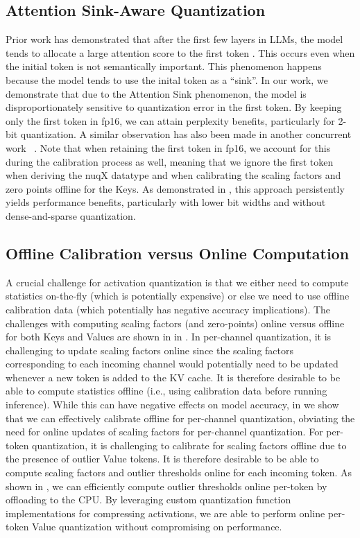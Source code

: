 \subsection{Attention Sink-Aware Quantization}
\label{sec:attn-sink}

Prior work has demonstrated that after the first few layers in LLMs, the model tends to allocate a large attention score to the first token \cite{xiao2023efficient}. This occurs even when the initial token is not semantically important. This phenomenon happens because the model tends to use the inital token as a “sink”. In our work, we demonstrate that due to the Attention Sink phenomenon, the model is disproportionately sensitive to quantization error in the first token. By keeping only the first token in fp16, we can attain perplexity benefits, particularly for 2-bit quantization. A similar observation has also been made in another concurrent work ~\cite{liu2024intactkv}. Note that when retaining the first token in fp16, we account for this during the calibration process as well, meaning that we ignore the first token when deriving the nuqX datatype and when calibrating the scaling factors and zero points offline for the Keys. As demonstrated in , this approach persistently yields performance benefits, particularly with lower bit widths and without dense-and-sparse quantization.

\subsection{Offline Calibration versus Online Computation}
\label{sec:calibration}

A crucial challenge for activation quantization is that we either need to compute statistics on-the-fly (which is potentially expensive) or else we need to use offline calibration data (which potentially has negative accuracy implications). The challenges with computing scaling factors (and zero-points) online versus offline for both Keys and Values are shown in  in .
In per-channel quantization, it is challenging to update scaling factors online since the scaling factors corresponding to each incoming channel would potentially need to be updated whenever a new token is added to the KV cache. It is therefore desirable to be able to compute statistics offline (i.e., using calibration data before running inference). While this can have negative effects on model accuracy, in  we show that we can effectively calibrate offline for per-channel quantization, obviating the need for online updates of scaling factors for per-channel quantization. For per-token quantization, it is challenging to calibrate for scaling factors offline due to the presence of outlier Value tokens. It is therefore desirable to be able to compute scaling factors and outlier thresholds online for each incoming token. As shown in , we can efficiently compute outlier thresholds online per-token by offloading to the CPU. By leveraging custom quantization function implementations for compressing activations, we are able to perform online per-token Value quantization without compromising on performance.

